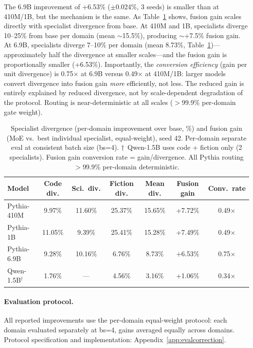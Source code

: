 \documentclass{article}
\begin{document}
The 6.9B improvement of +6.53\% ($\pm$0.024\%, 3 seeds) is smaller than at 410M/1B, but the mechanism is the same. As Table~\ref{tab:divergence} shows, fusion gain scales directly with specialist divergence from base. At 410M and 1B, specialists diverge 10--25\% from base per domain (mean $\sim$15.5\%), producing $\sim$+7.5\% fusion gain. At 6.9B, specialists diverge 7--10\% per domain (mean 8.73\%, Table~\ref{tab:divergence})---approximately half the divergence at smaller scales---and the fusion gain is proportionally smaller (+6.53\%). Importantly, the \emph{conversion efficiency} (gain per unit divergence) is 0.75$\times$ at 6.9B versus 0.49$\times$ at 410M/1B: larger models convert divergence into fusion gain \emph{more} efficiently, not less. The reduced gain is entirely explained by reduced divergence, not by scale-dependent degradation of the protocol. Routing is near-deterministic at all scales ($>$99.9\% per-domain gate weight).

\begin{table}[h]
\centering
\caption{Specialist divergence (per-domain improvement over base, \%) and fusion gain (MoE vs.\ best individual specialist, equal-weight), seed 42. Per-domain separate eval at consistent batch size (bs=4). $\dagger$~Qwen-1.5B uses code + fiction only (2 specialists). Fusion gain conversion rate = gain/divergence. All Pythia routing $>$99.9\% per-domain deterministic.}
\label{tab:divergence}
\small
\begin{tabular}{lcccccc}
\toprule
\textbf{Model} & \textbf{Code div.} & \textbf{Sci.\ div.} & \textbf{Fiction div.} & \textbf{Mean div.} & \textbf{Fusion gain} & \textbf{Conv.\ rate} \\
\midrule
Pythia-410M         & 9.97\%  & 11.60\% & 25.37\% & 15.65\% & +7.72\% & 0.49$\times$ \\
Pythia-1B           & 11.05\% & 9.39\%  & 25.41\% & 15.28\% & +7.49\% & 0.49$\times$ \\
Pythia-6.9B         & 9.28\%  & 10.16\% & 6.76\%  & 8.73\%  & +6.53\% & 0.75$\times$ \\
Qwen-1.5B$^\dagger$ & 1.76\%  & ---     & 4.56\%  & 3.16\%  & +1.06\% & 0.34$\times$ \\
\bottomrule
\end{tabular}
\end{table}

\paragraph{Evaluation protocol.} All reported improvements use the per-domain equal-weight protocol: each domain evaluated separately at bs=4, gains averaged equally across domains. Protocol specification and implementation: Appendix~\ref{app:evalcorrection}.
\end{document}
